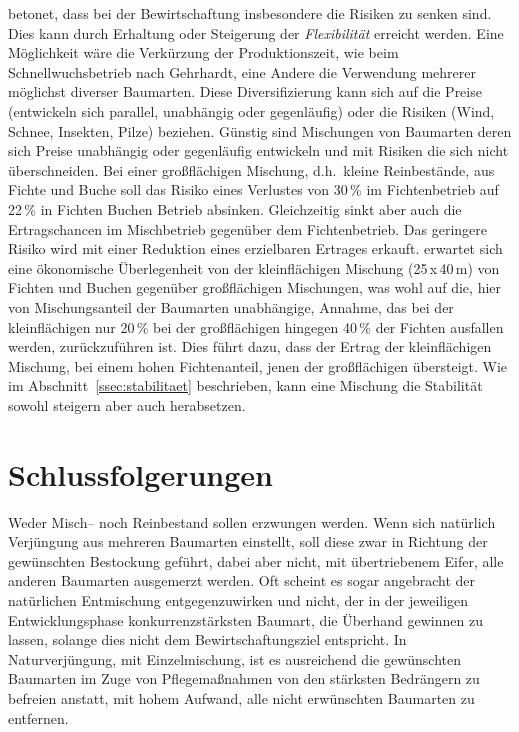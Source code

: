 \documentclass[twocolumn]{scrartcl}
\begin{document}
\cite{knoke2007mischwald} betonet, dass bei der Bewirtschaftung
insbesondere die Risiken zu senken sind. Dies kann durch Erhaltung
oder Steigerung der \emph{Flexibilität} erreicht werden. Eine
Möglichkeit wäre die Verkürzung der Produktionszeit, wie beim
Schnellwuchsbetrieb nach Gehrhardt, eine Andere die Verwendung
mehrerer möglichst diverser Baumarten. Diese Diversifizierung kann
sich auf die Preise (entwickeln sich parallel, unabhängig oder
gegenläufig) oder die Risiken (Wind, Schnee, Insekten, Pilze)
beziehen. Günstig sind Mischungen von Baumarten deren sich Preise
unabhängig oder gegenläufig entwickeln und mit Risiken die sich nicht
überschneiden. Bei einer großflächigen Mischung, d.h.\ kleine
Reinbestände, aus Fichte und Buche soll das Risiko eines Verlustes von
30\,\% im Fichtenbetrieb auf 22\,\% in Fichten Buchen Betrieb
absinken. Gleichzeitig sinkt aber auch die Ertragschancen im
Mischbetrieb gegenüber dem Fichtenbetrieb. Das geringere Risiko wird
mit einer Reduktion eines erzielbaren Ertrages erkauft.
\cite{knoke2007mischwaldB} erwartet sich eine ökonomische
Überlegenheit von der kleinflächigen Mischung (25\,x\,40\,m) von
Fichten und Buchen gegenüber großflächigen Mischungen, was wohl auf
die, hier von Mischungsanteil der Baumarten unabhängige, Annahme, das
bei der kleinflächigen nur 20\,\% bei der großflächigen hingegen
40\,\% der Fichten ausfallen werden, zurückzuführen ist. Dies führt
dazu, dass der Ertrag der kleinflächigen Mischung, bei einem hohen
Fichtenanteil, jenen der großflächigen übersteigt. Wie im
Abschnitt~\ref{ssec:stabilitaet} beschrieben, kann eine Mischung die
Stabilität sowohl steigern aber auch herabsetzen.

\section{Schlussfolgerungen}
\label{sec:schlussfolgerungen}

Weder Misch-- noch Reinbestand sollen erzwungen werden. Wenn sich
natürlich Verjüngung aus mehreren Baumarten einstellt, soll diese zwar
in Richtung der gewünschten Bestockung geführt, dabei aber nicht, mit
übertriebenem Eifer, alle anderen Baumarten ausgemerzt werden. Oft
scheint es sogar angebracht der natürlichen Entmischung
entgegenzuwirken und nicht, der in der jeweiligen Entwicklungsphase
konkurrenzstärksten Baumart, die Überhand gewinnen zu lassen, solange
dies nicht dem Bewirtschaftungsziel entspricht. In Naturverjüngung,
mit Einzelmischung, ist es ausreichend die gewünschten Baumarten im
Zuge von Pflegemaßnahmen von den stärksten Bedrängern zu befreien
anstatt, mit hohem Aufwand, alle nicht erwünschten Baumarten zu
entfernen.
\end{document}
